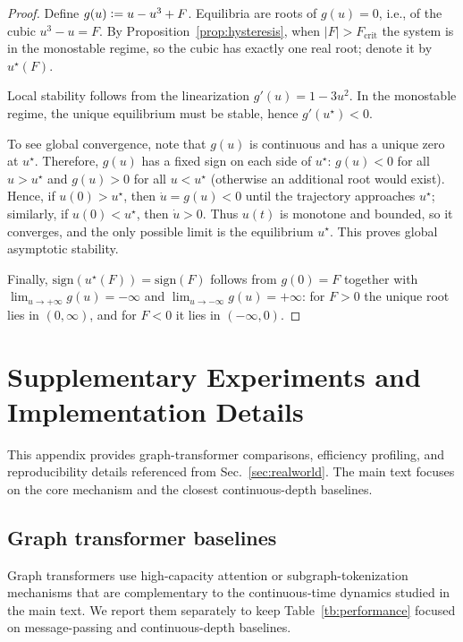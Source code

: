 \documentclass{article}
\newcommand{\defeq}{\vcentcolon=}
\theoremstyle{plain}
\theoremstyle{definition}
\theoremstyle{remark}
\begin{document}
\begin{proof}
    Define $g(u)\defeq u-u^3+F$. Equilibria are roots of $g(u)=0$, i.e., of the cubic $u^3-u=F$.
    By Proposition~\ref{prop:hysteresis}, when $|F|>F_{\mathrm{crit}}$ the system is in the monostable regime,
    so the cubic has exactly one real root; denote it by $u^\star(F)$.

    Local stability follows from the linearization $g'(u)=1-3u^2$. In the
    monostable regime, the unique equilibrium must be stable, hence
    $g'(u^\star)<0$.

    To see global convergence, note that $g(u)$ is continuous and has a unique zero
    at $u^\star$. Therefore, $g(u)$ has a fixed sign on each side of $u^\star$:
    $g(u)<0$ for all $u>u^\star$ and $g(u)>0$ for all $u<u^\star$ (otherwise an
    additional root would exist). Hence, if $u(0)>u^\star$, then $\dot u=g(u)<0$
    until the trajectory approaches $u^\star$; similarly, if $u(0)<u^\star$, then
    $\dot u>0$. Thus $u(t)$ is monotone and bounded, so it converges, and the only
    possible limit is the equilibrium $u^\star$. This proves global asymptotic
    stability.

    Finally, $\mathrm{sign}(u^\star(F))=\mathrm{sign}(F)$ follows from $g(0)=F$
    together with $\lim_{u\to +\infty}g(u)=-\infty$ and $\lim_{u\to
            -\infty}g(u)=+\infty$: for $F>0$ the unique root lies in $(0,\infty)$, and for
    $F<0$ it lies in $(-\infty,0)$.
\end{proof}

\section{Supplementary Experiments and Implementation Details}
\label{app:supplementary_details}

This appendix provides graph-transformer comparisons, efficiency profiling, and
reproducibility details referenced from Sec.~\ref{sec:realworld}. The main text
focuses on the core mechanism and the closest continuous-depth baselines.

\subsection{Graph transformer baselines}
\label{app:transformer_baselines}

Graph transformers use high-capacity attention or subgraph-tokenization
mechanisms that are complementary to the continuous-time dynamics studied in
the main text. We report them separately to keep Table~\ref{tb:performance}
focused on message-passing and continuous-depth baselines.
\end{document}
